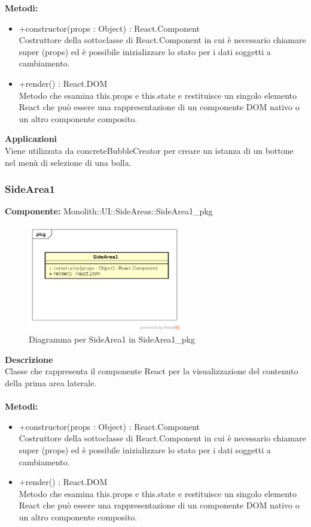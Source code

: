\textbf{Metodi:} \begin{itemize}\item +constructor(props : Object) : React.Component \\Costruttore della sottoclasse di React.Component in cui è necessario chiamare super (props) ed è possibile inizializzare lo stato per i dati soggetti a cambiamento. 

\item +render() : React.DOM \\Metodo che esamina this.props e this.state e restituisce un singolo elemento React che può essere una rappresentazione di un componente DOM nativo o un altro componente composito.\end{itemize} 


\textbf{Applicazioni}\\
Viene utilizzata da concreteBubbleCreator per creare un istanza di un bottone nel menù di selezione di una bolla. 


\clearpage

\subsubsection{SideArea1}
\textbf{Componente:}  Monolith::UI::SideAreas::SideArea1\_pkg\\
   \FloatBarrier
   \begin{figure}[ht]
   \centering
   \includegraphics[width=0.6\textwidth]{img/single-SideArea1}
   \caption{{Diagramma per SideArea1 in SideArea1\_pkg}}
\end{figure}
\FloatBarrier
\textbf{Descrizione}\\
Classe che rappresenta il componente React per la visualizzazione del contenuto della prima area laterale. \\\\ 
\textbf{Metodi:} \begin{itemize}\item +constructor(props : Object) : React.Component \\Costruttore della sottoclasse di React.Component in cui è necessario chiamare super (props) ed è possibile inizializzare lo stato per i dati soggetti a cambiamento.\item +render() : React.DOM \\Metodo che esamina this.props e this.state e restituisce un singolo elemento React che può essere una rappresentazione di un componente DOM nativo o un altro componente composito.\end{itemize} 


